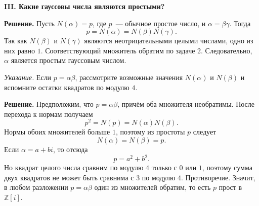 \begin{center}
    {\large\bfseries III. Какие гауссовы числа являются простыми?}
\end{center}


\smallskip
\textbf{Решение.}
Пусть $N(\alpha)=p$, где $p$~--- обычное простое число, и
$\alpha=\beta\gamma$. Тогда
\[
    p=N(\alpha)=N(\beta)N(\gamma).
\]
Так как $N(\beta)$ и $N(\gamma)$ являются неотрицательными целыми
числами, одно из них равно $1$. Соответствующий множитель обратим по
задаче 2. Следовательно, $\alpha$ является простым гауссовым числом.

\medskip


\textit{Указание.} Если $p=\alpha\beta$, рассмотрите возможные значения
$N(\alpha)$ и $N(\beta)$ и вспомните остатки квадратов по модулю $4$.

\smallskip
\textbf{Решение.}
Предположим, что $p=\alpha\beta$, причём оба множителя необратимы.
После перехода к нормам получаем
\[
    p^2=N(p)=N(\alpha)N(\beta).
\]
Нормы обоих множителей больше $1$, поэтому из простоты $p$ следует
\[
    N(\alpha)=N(\beta)=p.
\]
Если $\alpha=a+bi$, то отсюда
\[
    p=a^2+b^2.
\]
Но квадрат целого числа сравним по модулю $4$ только с $0$ или $1$,
поэтому сумма двух квадратов не может быть сравнима с $3$ по модулю
$4$. Противоречие. Значит, в любом разложении $p=\alpha\beta$
один из множителей обратим, то есть $p$ прост в $\mathbb Z[i]$.